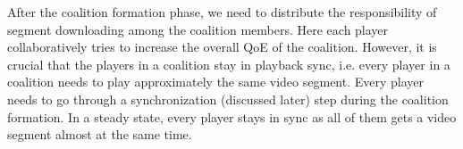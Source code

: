 
After the coalition formation phase, we need to distribute the responsibility of segment downloading among the coalition members. Here each player collaboratively tries to increase the overall QoE of the coalition. However, it is crucial that the players in a coalition stay in playback sync, i.e. every player in a coalition needs to play approximately the same video segment. Every player needs to go through a synchronization (discussed later) step during the coalition formation. In a steady state, every player stays in sync as all of them gets a video segment almost at the same time.

